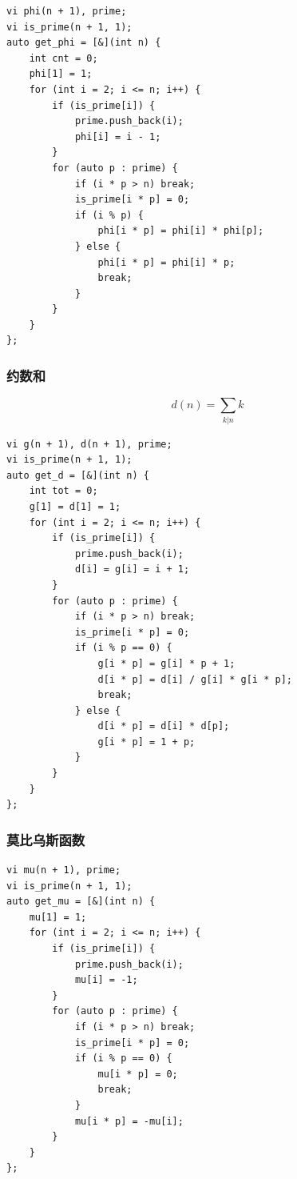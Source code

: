 \documentclass[UTF8, a4paper, titlepage, twoside]{ctexart}
\begin{document}
\begin{lstlisting}[style=cpp]
vi phi(n + 1), prime;
vi is_prime(n + 1, 1);
auto get_phi = [&](int n) {
    int cnt = 0;
    phi[1] = 1;
    for (int i = 2; i <= n; i++) {
        if (is_prime[i]) {
            prime.push_back(i);
            phi[i] = i - 1;
        }
        for (auto p : prime) {
            if (i * p > n) break;
            is_prime[i * p] = 0;
            if (i % p) {
                phi[i * p] = phi[i] * phi[p];
            } else {
                phi[i * p] = phi[i] * p;
                break;
            }
        }
    }
};
\end{lstlisting}

\subsubsection*{ 约数和 }

$$
d(n) = \sum_{k | n} k
$$

\begin{lstlisting}[style=cpp]
vi g(n + 1), d(n + 1), prime;
vi is_prime(n + 1, 1);
auto get_d = [&](int n) {
    int tot = 0;
    g[1] = d[1] = 1;
    for (int i = 2; i <= n; i++) {
        if (is_prime[i]) {
            prime.push_back(i);
            d[i] = g[i] = i + 1;
        }
        for (auto p : prime) {
            if (i * p > n) break;
            is_prime[i * p] = 0;
            if (i % p == 0) {
                g[i * p] = g[i] * p + 1;
                d[i * p] = d[i] / g[i] * g[i * p];
                break;
            } else {
                d[i * p] = d[i] * d[p];
                g[i * p] = 1 + p;
            }
        }
    }
};
\end{lstlisting}

\subsubsection*{ 莫比乌斯函数 }

\begin{lstlisting}[style=cpp]
vi mu(n + 1), prime;
vi is_prime(n + 1, 1);
auto get_mu = [&](int n) {
    mu[1] = 1;
    for (int i = 2; i <= n; i++) {
        if (is_prime[i]) {
            prime.push_back(i);
            mu[i] = -1;
        }
        for (auto p : prime) {
            if (i * p > n) break;
            is_prime[i * p] = 0;
            if (i % p == 0) {
                mu[i * p] = 0;
                break;
            }
            mu[i * p] = -mu[i];
        }
    }
};
\end{lstlisting}
\end{document}
